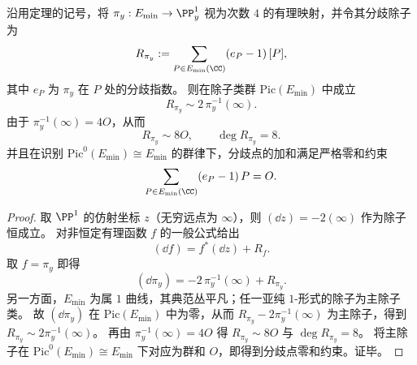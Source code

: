 \begin{theorem}
\begin{proposition}\label{prop:xi-terminal-zm-leyang-ramification-divisor-stokes}
沿用定理的记号，将 \(\pi_y:E_{\min}\to\PP^1_y\) 视为次数 \(4\) 的有理映射，并令其分歧除子为
\[
R_{\pi_y}:=\sum_{P\in E_{\min}(\CC)}(e_P-1)\,[P],
\]
其中 \(e_P\) 为 \(\pi_y\) 在 \(P\) 处的分歧指数。
则在除子类群 \(\mathrm{Pic}(E_{\min})\) 中成立
\[
R_{\pi_y}\sim 2\,\pi_y^{-1}(\infty).
\]
由于 \(\pi_y^{-1}(\infty)=4O\)，从而
\[
R_{\pi_y}\sim 8O,\qquad \deg R_{\pi_y}=8.
\]
并且在识别 \(\mathrm{Pic}^0(E_{\min})\cong E_{\min}\) 的群律下，分歧点的加和满足严格零和约束
\[
\sum_{P\in E_{\min}(\CC)}(e_P-1)\,P=O.
\]
\end{proposition}
\begin{proof}
取 \(\PP^1\) 的仿射坐标 \(z\)（无穷远点为 \(\infty\)），则 \((\dd z)=-2(\infty)\) 作为除子恒成立。
对非恒定有理函数 \(f\) 的一般公式给出
\[
(\dd f)=f^\ast(\dd z)+R_f.
\]
取 \(f=\pi_y\) 即得
\[
(\dd \pi_y)=-2\,\pi_y^{-1}(\infty)+R_{\pi_y}.
\]
另一方面，\(E_{\min}\) 为属 \(1\) 曲线，其典范丛平凡；任一亚纯 \(1\)-形式的除子为主除子类。
故 \((\dd \pi_y)\) 在 \(\mathrm{Pic}(E_{\min})\) 中为零，从而 \(R_{\pi_y}-2\pi_y^{-1}(\infty)\) 为主除子，得到 \(R_{\pi_y}\sim 2\pi_y^{-1}(\infty)\)。
再由 \(\pi_y^{-1}(\infty)=4O\) 得 \(R_{\pi_y}\sim 8O\) 与 \(\deg R_{\pi_y}=8\)。
将主除子在 \(\mathrm{Pic}^0(E_{\min})\cong E_{\min}\) 下对应为群和 \(O\)，即得到分歧点零和约束。证毕。
\end{proof}


\end{theorem}
